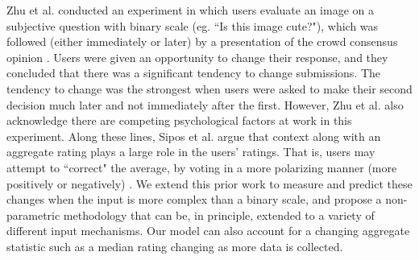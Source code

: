 Zhu et al. conducted an experiment in which users evaluate an image on a subjective question with binary scale (eg. ``Is this image cute?"), which was followed (either immediately or later) by a presentation of the crowd consensus opinion \cite{zhu2012switch}. 
Users were given an opportunity to change their response, and they concluded that there was a significant tendency to change submissions.
The tendency to change was the strongest when users were asked to make their second decision much later and not immediately after the first.
However, Zhu et al. also acknowledge there are competing psychological factors at work in this experiment.
Along these lines, Sipos et al. argue that context along with an aggregate rating plays a large role in the users' ratings. That is, users may attempt to ``correct" the average, by voting in a more polarizing manner (more positively or negatively) \cite{siposreview}.
We extend this prior work to measure and predict these changes when the input is more complex than a binary scale, and propose a non-parametric methodology that can be, in principle, extended to a variety of different input mechanisms.
Our model can also account for a changing aggregate statistic such as a median rating changing as more data is collected. 







